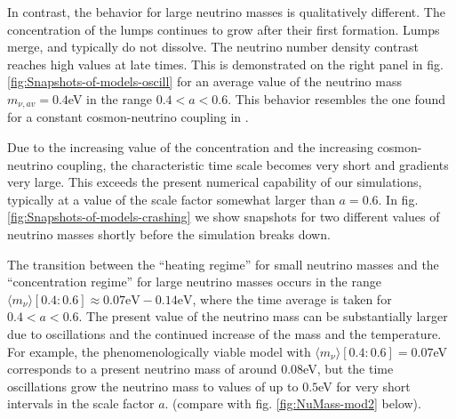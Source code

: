 In contrast, the behavior for large neutrino masses is qualitatively
different. The concentration of the lumps continues to grow after
their first formation. Lumps merge, and typically do not dissolve.
The neutrino number density contrast reaches high values at late times.
This is demonstrated on the right panel in fig.\ref{fig:Snapshots-of-models-oscill}
for an average value of the neutrino mass $m_{\nu,av}=0.4$eV in the
range $0.4<a<0.6$. This behavior resembles the one found for a constant
cosmon-neutrino coupling in \cite{ayaita_neutrino_2013,ayaita_structure_2012,baldi_oscillating_2011}.

Due to the increasing value of the concentration and the increasing
cosmon-neutrino coupling, the characteristic time scale becomes very
short and gradients very large. This exceeds the present numerical
capability of our simulations, typically at a value of the scale factor
somewhat larger than $a=0.6$. In fig.\ref{fig:Snapshots-of-models-crashing}
we show snapshots for two different values of neutrino masses shortly
before the simulation breaks down.

The transition between the ``heating regime'' for small neutrino
masses and the ``concentration regime'' for large neutrino masses
occurs in the range $\langle m_{\nu}\rangle[0.4:0.6]\approx0.07\mbox{eV}-0.14\mbox{eV}$,
where the time average is taken for $0.4<a<0.6$. The present value
of the neutrino mass can be substantially larger due to oscillations
and the continued increase of the mass and the temperature. For example,
the phenomenologically viable model with $\langle m_{\nu}\rangle[0.4:0.6]=0.07$eV
corresponds to a present neutrino mass of around $0.08$eV, but the
time oscillations grow the neutrino mass to values of up to $0.5$eV
for very short intervals in the scale factor $a$. (compare with fig.
\ref{fig:NuMass-mod2} below).

